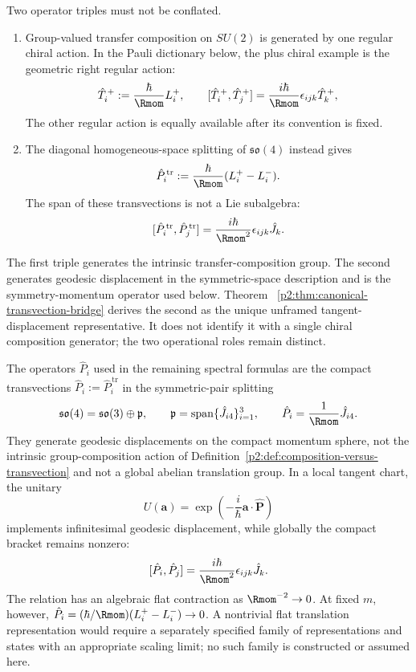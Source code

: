\documentclass[12pt,a4paper]{article}
\begin{document}
\begin{definition}
\label{p2:def:composition-versus-transvection}
Two operator triples must not be conflated.
\begin{enumerate}[label=(\roman*), leftmargin=2em]
\item Group-valued transfer composition on \(SU(2)\) is generated by one
regular chiral action.  In the Pauli dictionary below, the plus
chiral example is the geometric right regular action:
\[
 \hat T_i^{\,+}:=\frac{\hbar}{\Rmom}L_i^+,
 \qquad
 [\hat T_i^{\,+},\hat T_j^{\,+}]
 =\frac{i\hbar}{\Rmom}\epsilon_{ijk}\hat T_k^{\,+},
\]
The other regular action is equally available after its convention is fixed.
\item The diagonal homogeneous-space splitting of
\(\mathfrak{so}(4)\) instead gives
\[
 \hat P_i^{\,\mathrm{tr}}
 :=\frac{\hbar}{\Rmom}(L_i^+-L_i^-).
\]
The span of these transvections is not a Lie subalgebra:
\[
 [\hat P_i^{\,\mathrm{tr}},\hat P_j^{\,\mathrm{tr}}]
 =\frac{i\hbar}{\Rmom^2}\epsilon_{ijk}\hat J_k.
\]
\end{enumerate}
The first triple generates the intrinsic transfer-composition group.  The
second generates geodesic displacement in the symmetric-space description and
is the symmetry-momentum operator used below.  Theorem~
\ref{p2:thm:canonical-transvection-bridge} derives the second as the unique
unframed tangent-displacement representative.  It does not identify it with a
single chiral composition generator; the two operational roles remain
distinct.
\end{definition}

\begin{definition}
\label{p2:def:compact-momentum-generators}
The operators \(\hat P_i\) used in the remaining spectral
formulas are the compact transvections
\(\hat P_i:=\hat P_i^{\,\mathrm{tr}}\) in the symmetric-pair splitting
\[
\mathfrak{so}(4)=\mathfrak{so}(3)\oplus\mathfrak p,
\qquad
\mathfrak p=\mathrm{span}\{\hat J_{i4}\}_{i=1}^3,
\qquad
\hat P_i=\frac{1}{\Rmom}\hat J_{i4}.
\]
They generate geodesic displacements on the compact momentum sphere, not the
intrinsic group-composition action of
Definition~\ref{p2:def:composition-versus-transvection} and not a global
abelian translation group.  In a local tangent chart, the unitary
\[
U(\mathbf a)=\exp\left(-\frac{i}{\hbar}\mathbf a\cdot\hat{\mathbf P}\right)
\]
implements infinitesimal geodesic displacement, while globally the compact
bracket remains nonzero:
\[
[\hat P_i,\hat P_j]
=\frac{i\hbar}{\Rmom^2}\epsilon_{ijk}\hat J_k.
\]
The relation has an algebraic flat contraction as
\(\Rmom^{-2}\to0\).  At fixed \(m\), however,
\(\hat P_i=(\hbar/\Rmom)(L_i^+-L_i^-)\to0\).  A nontrivial flat
translation representation would require a separately specified family of
representations and states with an appropriate scaling limit; no such family
is constructed or assumed here.
\end{definition}
\end{document}
